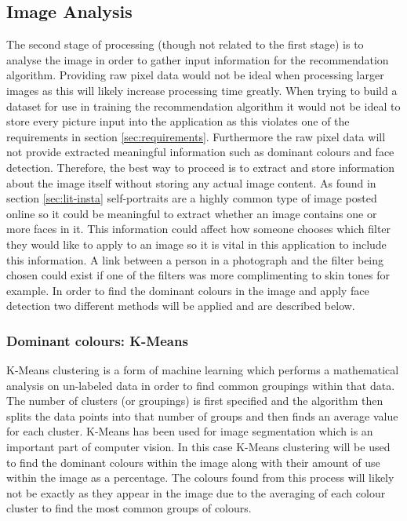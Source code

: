 \documentclass[a4paper,12pt]{report}
\begin{document}
    \subsection{Image Analysis}
      The second stage of processing (though not related to the first stage) is to analyse the image in order to gather input information for the recommendation algorithm. Providing raw pixel data would not be ideal when processing larger images as this will likely increase processing time greatly. When trying to build a dataset for use in training the recommendation algorithm it would not be ideal to store every picture input into the application as this violates one of the requirements in section \ref{sec:requirements}. Furthermore the raw pixel data will not provide extracted meaningful information such as dominant colours and face detection. Therefore, the best way to proceed is to extract and store information about the image itself without storing any actual image content. As found in section \ref{sec:lit-insta} self-portraits are a highly common type of image posted online so it could be meaningful to extract whether an image contains one or more faces in it. This information could affect how someone chooses which filter they would like to apply to an image so it is vital in this application to include this information. A link between a person in a photograph and the filter being chosen could exist if one of the filters was more complimenting to skin tones for example. In order to find the dominant colours in the image and apply face detection two different methods will be applied and are described below.

      \subsubsection{Dominant colours: K-Means} \label{sec:kmeans}
        K-Means clustering \citep{macqueen1967some} is a form of machine learning which performs a mathematical analysis on un-labeled data in order to find common groupings within that data. The number of clusters (or groupings) is first specified and the algorithm then splits the data points into that number of groups and then finds an average value for each cluster. K-Means has been used for image segmentation \citep{coleman1979image,shi2000normalized} which is an important part of computer vision. In this case K-Means clustering will be used to find the dominant colours within the image along with their amount of use within the image as a percentage. The colours found from this process will likely not be exactly as they appear in the image due to the averaging of each colour cluster to find the most common groups of colours.
\end{document}
